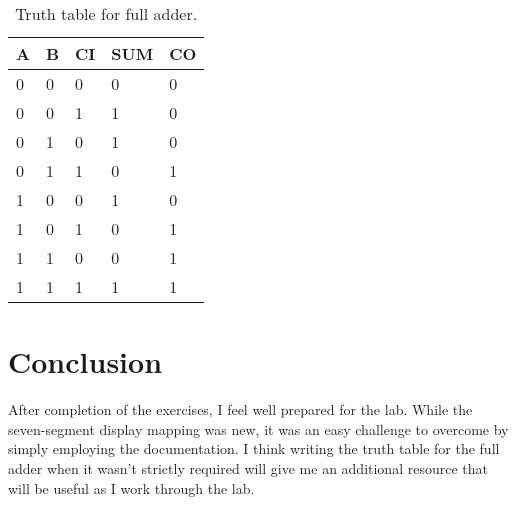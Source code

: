 \documentclass[11pt]{article}
\begin{document}
\begin{table}[h]
\begin{center}
	\begin{tabular}{| l | l | l | l | l |}
		\hline
		A & B & CI & SUM & CO \\ \hline
		0 & 0 & 0 & 0 & 0 \\ \hline
		0 & 0 & 1 & 1 & 0 \\ \hline
		0 & 1 & 0 & 1 & 0 \\ \hline
		0 & 1 & 1 & 0 & 1 \\ \hline
		1 & 0 & 0 & 1 & 0 \\ \hline
		1 & 0 & 1 & 0 & 1 \\ \hline
		1 & 1 & 0 & 0 & 1 \\ \hline
		1 & 1 & 1 & 1 & 1 \\ \hline
	\end{tabular}
	\caption{\label{tab:table-name}Truth table for full adder.}
\end{center}	
\end{table}


\section{Conclusion}

After completion of the exercises, I feel well prepared for the lab. While the seven-segment display mapping was new, it was an easy challenge to overcome by simply employing the documentation. I think writing the truth table for the full adder when it wasn't strictly required will give me an additional resource that will be useful as I work through the lab.
\end{document}
